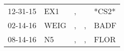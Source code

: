 \begin{supertabular}{lllll}
 12-31-15 &   EX1 &  , &    &  *CS2* \\
 02-14-16 &  WEIG &  , &  , &   BADF \\
 08-14-16 &    N5 &  , &  , &   FLOR \\
\end{supertabular}
